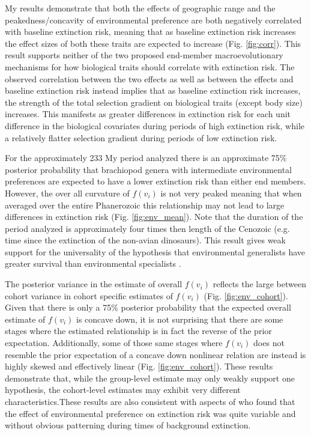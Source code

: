 \documentclass{article}
\begin{document}
My results demonstrate that both the effects of geographic range and the peakedness/concavity of environmental preference are both negatively correlated with baseline extinction risk, meaning that as baseline extinction risk increases the effect sizes of both these traits are expected to increase (Fig. \ref{fig:corr}). This result supports neither of the two proposed end-member macroevolutionary mechanisms for how biological traits should correlate with extinction risk. The observed correlation between the two effects as well as between the effects and baseline extinction risk instead implies that as baseline extinction risk increases, the strength of the total selection gradient on biological traits (except body size) increases. This manifests as greater differences in extinction risk for each unit difference in the biological covariates during periods of high extinction risk, while a relatively flatter selection gradient during periods of low extinction risk.

For the approximately 233 My period analyzed there is an approximate 75\% posterior probability that brachiopod genera with intermediate environmental preferences are expected to have a lower extinction risk than either end members. However, the over all curvature of \(f(v_{i})\) is not very peaked meaning that when averaged over the entire Phanerozoic this relationship may not lead to large differences in extinction risk (Fig. \ref{fig:env_mean}). Note that the duration of the period analyzed is approximately four times then length of the Cenozoic (e.g. time since the extinction of the non-avian dinosaurs). This result gives weak support for the universality of the hypothesis that environmental generalists have greater survival than environmental specialists \citep{Simpson1944,Liow2004a,Liow2007b,Nurnberg2013a,Nurnberg2015}.

The posterior variance in the estimate of overall \(f(v_{i})\) reflects the large between cohort variance in cohort specific estimates of \(f(v_{i})\) (Fig. \ref{fig:env_cohort}). Given that there is only a 75\% posterior probability that the expected overall estimate of \(f(v_{i})\) is concave down, it is not surprising that there are some stages where the estimated relationship is in fact the reverse of the prior expectation. Additionally, some of those same stages where \(f(v_{i})\) does not resemble the prior expectation of a concave down nonlinear relation are instead is highly skewed and effectively linear (Fig. \ref{fig:env_cohort}). These results demonstrate that, while the group-level estimate may only weakly support one hypothesis, the cohort-level estimates may exhibit very different characteristics.These results are also consistent with aspects of \citet{Miller2009a} who found that the effect of environmental preference on extinction risk was quite variable and without obvious patterning during times of background extinction.
\end{document}
